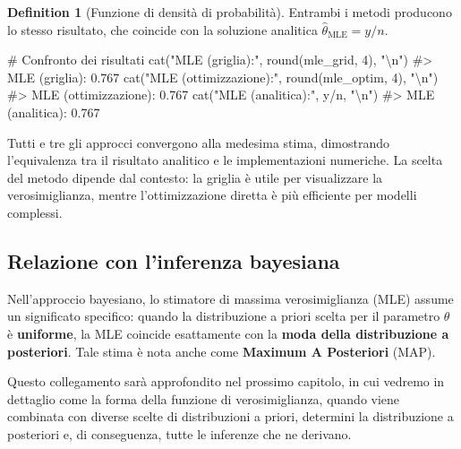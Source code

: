 \documentclass[
  letterpaper,
  DIV=11,
  numbers=noendperiod,
  oneside]{scrreprt}
\newenvironment{Shaded}{\begin{snugshade}}{\end{snugshade}}
\newcommand{\CommentTok}[1]{\textcolor[rgb]{0.37,0.37,0.37}{#1}}
\newcommand{\DecValTok}[1]{\textcolor[rgb]{0.68,0.00,0.00}{#1}}
\newcommand{\FunctionTok}[1]{\textcolor[rgb]{0.28,0.35,0.67}{#1}}
\newcommand{\NormalTok}[1]{\textcolor[rgb]{0.00,0.23,0.31}{#1}}
\newcommand{\SpecialCharTok}[1]{\textcolor[rgb]{0.37,0.37,0.37}{#1}}
\newcommand{\StringTok}[1]{\textcolor[rgb]{0.13,0.47,0.30}{#1}}
\theoremstyle{definition}
\theoremstyle{plain}
\theoremstyle{definition}
\newtheorem{definition}{Definition}[chapter]
\theoremstyle{remark}
\begin{document}
\begin{definition}[Funzione di densità di
probabilità]
Entrambi i metodi producono lo stesso risultato, che coincide con la
soluzione analitica \(\hat{\theta}_{\text{MLE}} = y/n\).

\begin{Shaded}
\begin{Highlighting}[]
\CommentTok{\# Confronto dei risultati}
\FunctionTok{cat}\NormalTok{(}\StringTok{"MLE (griglia):"}\NormalTok{, }\FunctionTok{round}\NormalTok{(mle\_grid, }\DecValTok{4}\NormalTok{), }\StringTok{"}\SpecialCharTok{\textbackslash{}n}\StringTok{"}\NormalTok{)}
\CommentTok{\#\textgreater{} MLE (griglia): 0.767}
\FunctionTok{cat}\NormalTok{(}\StringTok{"MLE (ottimizzazione):"}\NormalTok{, }\FunctionTok{round}\NormalTok{(mle\_optim, }\DecValTok{4}\NormalTok{), }\StringTok{"}\SpecialCharTok{\textbackslash{}n}\StringTok{"}\NormalTok{)}
\CommentTok{\#\textgreater{} MLE (ottimizzazione): 0.767}
\FunctionTok{cat}\NormalTok{(}\StringTok{"MLE (analitica):"}\NormalTok{, y}\SpecialCharTok{/}\NormalTok{n, }\StringTok{"}\SpecialCharTok{\textbackslash{}n}\StringTok{"}\NormalTok{)}
\CommentTok{\#\textgreater{} MLE (analitica): 0.767}
\end{Highlighting}
\end{Shaded}

Tutti e tre gli approcci convergono alla medesima stima, dimostrando
l'equivalenza tra il risultato analitico e le implementazioni numeriche.
La scelta del metodo dipende dal contesto: la griglia è utile per
visualizzare la verosimiglianza, mentre l'ottimizzazione diretta è più
efficiente per modelli complessi.

\subsection{Relazione con l'inferenza
bayesiana}\label{relazione-con-linferenza-bayesiana}

Nell'approccio bayesiano, lo stimatore di massima verosimiglianza (MLE)
assume un significato specifico: quando la distribuzione a priori scelta
per il parametro \(\theta\) è \textbf{uniforme}, la MLE coincide
esattamente con la \textbf{moda della distribuzione a posteriori}. Tale
stima è nota anche come \textbf{Maximum A Posteriori} (MAP).

Questo collegamento sarà approfondito nel prossimo capitolo, in cui
vedremo in dettaglio come la forma della funzione di verosimiglianza,
quando viene combinata con diverse scelte di distribuzioni a priori,
determini la distribuzione a posteriori e, di conseguenza, tutte le
inferenze che ne derivano.


\end{definition}
\end{document}
